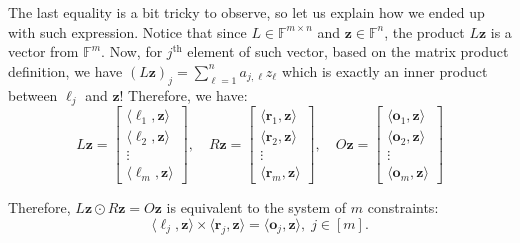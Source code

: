 \documentclass[../lecture-notes-148x210.tex]{subfiles}
\begin{document}
The last equality is a bit tricky to observe, so let us explain how we ended up with such expression. Notice that since $L \in \mathbb{F}^{m \times n}$ and $\mathbf{z} \in \mathbb{F}^n$, the product $L\mathbf{z}$ is a vector from $\mathbb{F}^m$. Now, for $j^{\text{th}}$ element of such vector, based on the matrix product definition, we have $(L\mathbf{z})_j = \sum_{\ell=1}^na_{j,\ell}z_{\ell}$ which is exactly an inner product between $\boldsymbol{\ell}_j$ and $\mathbf{z}$! Therefore, we have:
\begin{equation*}
    L\mathbf{z} = \begin{bmatrix}
        \langle \boldsymbol{\ell}_1, \mathbf{z}\rangle \\
        \langle \boldsymbol{\ell}_2, \mathbf{z}\rangle \\
        \vdots \\
        \langle \boldsymbol{\ell}_m, \mathbf{z}\rangle 
    \end{bmatrix}, \quad
    R\mathbf{z} = \begin{bmatrix}
        \langle \boldsymbol{r}_1, \mathbf{z}\rangle \\
        \langle \boldsymbol{r}_2, \mathbf{z}\rangle \\
        \vdots \\
        \langle \boldsymbol{r}_m, \mathbf{z}\rangle 
    \end{bmatrix}, \quad
    O\mathbf{z} = \begin{bmatrix}
        \langle \boldsymbol{o}_1, \mathbf{z}\rangle \\
        \langle \boldsymbol{o}_2, \mathbf{z}\rangle \\
        \vdots \\
        \langle \boldsymbol{o}_m, \mathbf{z}\rangle 
    \end{bmatrix}
\end{equation*}

Therefore, $L\mathbf{z} \odot R\mathbf{z} = O\mathbf{z}$ is equivalent to the system of $m$ constraints:
\begin{equation*}
    \langle \boldsymbol{\ell}_j, \mathbf{z}\rangle \times \langle \boldsymbol{r}_j, \mathbf{z} \rangle = \langle \boldsymbol{o}_j, \mathbf{z} \rangle, \; j \in [m].
\end{equation*}
\end{document}
